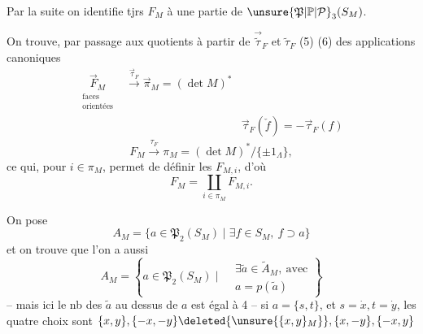 Par la suite on identifie tjrs $F_M$ à une
partie de $\unsure{\mathfrak P|\mathbb P|\mathcal P}_3(S_M)$.

On  trouve, par passage aux quotients
 à partir  de $\overrightarrow{\widetilde\tau}_F$  et $\widetilde\tau_F$ (5) (6)
des applications canoniques
\[
\begin{aligned}
\underset{\substack{\text{faces}\\\text{orientées}}}{\overrightarrow F_M}
&\xrightarrow{\overrightarrow\tau_F}\overrightarrow\pi_M=(\det M)^*\\
&&\overrightarrow\tau_F(\check f)=-\overrightarrow\tau_F(f)
\end{aligned}\tag*{(30)}
\]
\[
F_M\xrightarrow{\tau_F}\pi_M=(\det M)^*/\{\pm1_\Lambda\},\tag*{(31)}
\]
ce qui, pour $i\in\pi_M$, permet de définir
les $F_{M,i}$, d'où
\[
F_M=\coprod_{i\in\pi_M}F_{M,i}.\tag*{(32)}
\]

On pose
\[
A_M=\{a\in\mathfrak P_2(S_M)\mid\exists f\in S_M,\ f\supset a\}\tag*{(33)}
\]
et on trouve que l'on a aussi
\[
A_M=\left\{a\in\mathfrak P_2(S_M)\mid
\begin{aligned}&\exists\widetilde a\in\widetilde A_M,\ \text{avec}\\
&a=p(\widetilde a)\end{aligned}\right\}\tag*{(34)}
\]
-- mais ici le nb des $\widetilde a$  au dessus de $a$
est égal à 4 -- si $a=\{s,t\}$, et
$s=\dot x,t=\dot y$, les quatre choix sont
$\{x,y\},\{-x,-y\}\deleted{\unsure{\{x,y\}_M}},\{x,-y\},\{-x,y\}$
